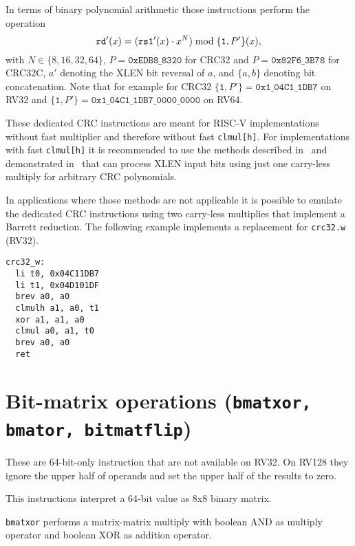 In terms of binary polynomial arithmetic those instructions perform the operation
$$ \texttt{rd}'(x) = (\texttt{rs1}'(x) \cdot x^N) \; \textrm{mod} \; \{\texttt{1}, P'\}(x)\textrm, $$
with $N \in \{8, 16, 32, 64\}$,
$P = \texttt{0xEDB8\_8320}$ for CRC32 and $P = \texttt{0x82F6\_3B78}$ for CRC32C,
$a'$ denoting the XLEN bit reversal of $a$,
and $\{a, b\}$ denoting bit concatenation.
Note that for example for CRC32 $\{\texttt{1}, P'\} = \texttt{0x1\_04C1\_1DB7}$
on RV32 and $\{\texttt{1}, P'\} = \texttt{0x1\_04C1\_1DB7\_0000\_0000}$ on RV64.

These dedicated CRC instructions are meant for RISC-V implementations without fast multiplier
and therefore without fast \texttt{clmul[h]}. For implementations with fast \texttt{clmul[h]}
it is recommended to use the methods described in~\cite{FastCRC} and demonstrated in~\cite{Wolf18A}
that can process XLEN input bits using just one carry-less multiply for arbitrary CRC polynomials.

In applications where those methods are not applicable it is possible to emulate the dedicated CRC
instructions using two carry-less multiplies that implement a Barrett reduction. The following example
implements a replacement for \texttt{crc32.w} (RV32).

\begin{minipage}{\linewidth}
\begin{verbatim}
crc32_w:
  li t0, 0x04C11DB7
  li t1, 0x04D101DF
  brev a0, a0
  clmulh a1, a0, t1
  xor a1, a1, a0
  clmul a0, a1, t0
  brev a0, a0
  ret
\end{verbatim}
\end{minipage}


\section{Bit-matrix operations (\texttt{bmatxor, bmator, bitmatflip})}

These are 64-bit-only instruction that are not available on RV32. On RV128 they
ignore the upper half of operands and set the upper half of the results to zero.

This instructions interpret a 64-bit value as 8x8 binary matrix.

\texttt{bmatxor} performs a matrix-matrix multiply with boolean AND as multiply
operator and boolean XOR as addition operator.

